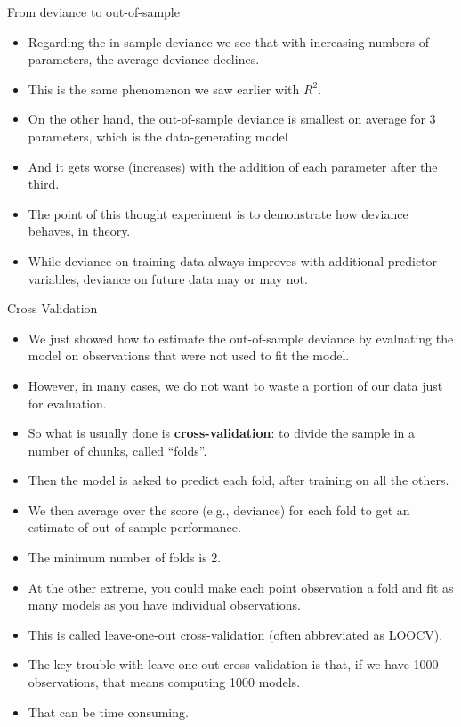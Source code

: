 \documentclass[handout]{beamer}
\begin{document}
\begin{frame}{From deviance to out-of-sample}
\scriptsize{

\begin{itemize}


\item Regarding the in-sample deviance we see that with increasing numbers of parameters, the average deviance declines. 
\item This is the same phenomenon we saw earlier with $R^2$.

\item On the other hand, the out-of-sample deviance is smallest on average for 3 parameters, which is the data-generating model
\item And it gets worse (increases) with the addition of each parameter after the third.

\item The point of this thought experiment is to demonstrate how deviance behaves, in theory. 
\item While deviance on training data always improves with additional predictor variables, deviance on future data may or may not.



\end{itemize}


} 
\end{frame}



\begin{frame}{Cross Validation}
\scriptsize{

\begin{itemize}
\item We just showed how to estimate the out-of-sample deviance by  evaluating the model on observations that were not used to fit the model. 

\item However, in many cases, we do not want to waste a portion of our data just for evaluation. 

\item So what is usually done is \textbf{cross-validation}: to divide the sample in a number of chunks, called ``folds''. 
\item Then the model is asked to predict each fold, after training on all the others.
\item We then average over the score (e.g., deviance) for each fold to get an estimate of out-of-sample performance. 
\item The minimum number of folds is 2. 
\item At the other extreme, you could make each point observation a fold and fit as many models as you have individual observations.
\item This is called leave-one-out cross-validation (often abbreviated as LOOCV).
\item The key trouble with leave-one-out cross-validation is that, if we have 1000 observations, that means computing 1000 models.
\item That can be time consuming.
\end{itemize}


} 
\end{frame}
\end{document}
